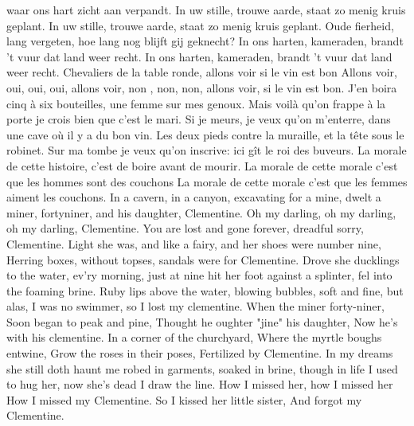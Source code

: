 \documentclass{article}
\begin{document}
\begin{songs}{}
waar ons hart zicht aan verpandt.
In uw stille, trouwe aarde,
staat zo menig kruis geplant.
In uw stille, trouwe aarde,
staat zo menig kruis geplant.
\endverse
\beginverse*
Oude fierheid, lang vergeten,
hoe lang nog blijft gij geknecht?
In ons harten, kameraden,
brandt 't vuur dat land weer recht.
In ons harten, kameraden,
brandt 't vuur dat land weer recht.
\endverse
\endsong
{}
\beginverse
Chevaliers de la table ronde,
allons voir si le vin est bon
\endverse
\beginchorus
Allons voir, oui, oui, oui,
allons voir, non , non, non,
allons voir, si le vin est bon.
\endchorus
\beginverse
J’en boira cinq à six bouteilles,
une femme sur mes genoux.
Mais voilà qu’on frappe à la porte
je crois bien que c’est le mari.
\endverse
\beginverse
Si je meurs, je veux qu’on m’enterre,
dans une cave où il y a du bon vin.
Les deux pieds contre la muraille,
et la tête sous le robinet.
\endverse
\beginverse
Sur ma tombe je veux qu’on inscrive:
ici gît le roi des buveurs.
La morale de cette histoire,
c’est de boire avant de mourir.
\endverse
\beginverse
La morale de cette morale
c’est que les hommes sont des couchons
La morale de cette morale
c’est que les femmes aiment les couchons.
\endverse
\endsong
{}
\beginverse
In a cavern, in a canyon,
excavating for a mine,
dwelt a miner, fortyniner, 
and his daughter, Clementine.
\endverse
\beginchorus
Oh my darling, oh my darling,
oh my darling, Clementine.
You are lost and gone forever,
dreadful sorry, Clementine.
\endchorus
\beginverse
Light she was, and like a fairy,
and her shoes were number nine,
Herring boxes, without topses,
sandals were for Clementine.
\endverse
\beginverse
Drove she ducklings to the water,
ev’ry morning, just at nine
hit her foot against a splinter,
fel into the foaming brine.
\endverse
\beginverse
Ruby lips above the water,
blowing bubbles, soft and fine,
but alas, I was no swimmer, 
so I lost my clementine.
\endverse
\beginverse
When the miner forty-niner,
Soon began to peak and pine,
Thought he oughter "jine" his daughter,
Now he's with his clementine.
\endverse
\beginverse
In a corner of the churchyard,
Where the myrtle boughs entwine,
Grow the roses in their poses,
Fertilized by Clementine.
\endverse
\beginverse
In my dreams she still doth haunt me
robed in garments, soaked in brine,
though in life I used to hug her, 
now she’s dead I draw the line.
\endverse
\beginverse
How I missed her, how I missed her
How I missed my Clementine.
So I kissed her little sister,
And forgot my Clementine.
\endverse
\endsong
\begin{intersong}

\end{intersong}
\end{songs}
\end{document}

